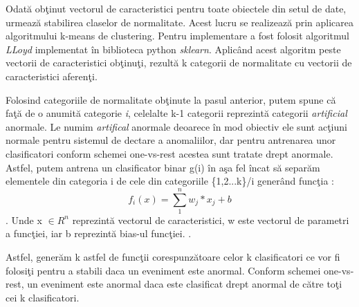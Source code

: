 \documentclass[a4paper,12pt]{report}
\begin{document}
\par Odată obţinut vectorul de caracteristici pentru toate obiectele din setul de date, urmează stabilirea claselor de normalitate. Acest lucru se realizează prin aplicarea algoritmului k-means de clustering. Pentru implementare a fost folosit algoritmul \emph{LLoyd} implementat în biblioteca python \emph{sklearn}. Aplicând acest algoritm peste vectorii de caracteristici obţinuţi, rezultă k categorii de normalitate cu vectorii de caracteristici aferenţi. 
\par Folosind categoriile de normalitate obţinute la pasul anterior, putem spune că faţă de o anumită categorie \emph{i}, celelalte k-1 categorii reprezintă categorii \emph{artificial} anormale. Le numim \emph{artifical} anormale deoarece în mod obiectiv ele sunt acţiuni normale pentru sistemul de dectare a anomaliilor, dar pentru antrenarea unor clasificatori conform schemei one-vs-rest acestea sunt tratate drept anormale. Astfel, putem antrena un clasificator binar g(i) în aşa fel încat să separăm elementele din categoria i de cele din categoriile \{1,2...k\}/i 
generând funcţia : \[f_{i}(x) = \sum_{1}^{n} w_{j} * x_{j} + b\]. Unde x \(\in{R}^n\) reprezintă vectorul de caracteristici, w este vectorul de parametri a funcţiei, iar b reprezintă bias-ul funcţiei. \cite{ionescu2019object}.
\par Astfel, generăm k astfel de funcţii corespunzătoare celor k clasificatori ce vor fi folosiţi pentru a stabili daca un eveniment este anormal. Conform schemei one-vs-rest, un eveniment este anormal daca este clasificat drept anormal de către toţi cei k clasificatori.
\vfill
\end{document}
